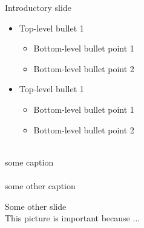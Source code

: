 \documentclass[LaTeX2e,10pt,aspectratio=169]{beamer}
\begin{document}
\begin{frame}{Introductory slide}
\begin{minipage}{0.50\textwidth}  %
\begin{itemize}			%
\item Top-level bullet 1
\begin{itemize}
\item Bottom-level bullet point 1
\item Bottom-level bullet point 2
\end{itemize}
\item Top-level bullet 1
\begin{itemize}
\item Bottom-level bullet point 1
\item Bottom-level bullet point 2
\end{itemize} 
\end{itemize}
\end{minipage}
\begin{minipage}{0.26\textwidth} %
\centering
\vspace{0.15cm}
\\
 some caption  \\
\vspace{0.15cm}
\\
 some other caption  \\
\end{minipage}
\end{frame}

\begin{frame}{Some other slide}
\vspace{0.15cm}
\\
\vspace{0.5cm}
This picture is important because $\dots$  \\
\end{frame}
\end{document}
